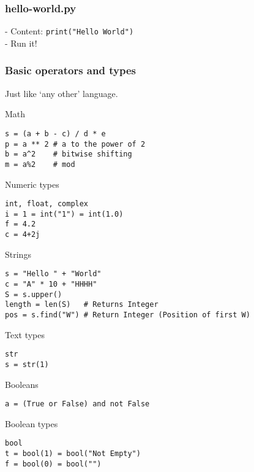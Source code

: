 \documentclass{beamer}
\begin{document}
\begin{frame}[fragile]
    \frametitle{hello-world.py}
    - Content: \texttt{print("Hello World")}\\
    - Run it!
\end{frame}
\begin{frame}[fragile]
    \frametitle{Basic operators and types}
    Just like `any other' language.
    \begin{block}{Math}
        \begin{verbatim}
s = (a + b - c) / d * e
p = a ** 2 # a to the power of 2
b = a^2    # bitwise shifting
m = a%2    # mod
        \end{verbatim}
    \end{block}
    \begin{exampleblock}{Numeric types}
    \begin{verbatim}
int, float, complex
i = 1 = int("1") = int(1.0)
f = 4.2
c = 4+2j
    \end{verbatim}
\end{exampleblock}
\end{frame}
\begin{frame}[fragile]
    \begin{block}{Strings}
        \begin{verbatim}
s = "Hello " + "World"
c = "A" * 10 + "HHHH"
S = s.upper()
length = len(S)   # Returns Integer
pos = s.find("W") # Return Integer (Position of first W)
        \end{verbatim}
    \end{block}
    \begin{exampleblock}{Text types}
        \begin{verbatim}
str
s = str(1)
        \end{verbatim}
    \end{exampleblock}
\end{frame}

\begin{frame}[fragile]
    \begin{block}{Booleans}
        \begin{verbatim}
a = (True or False) and not False
        \end{verbatim}
    \end{block}
    \begin{exampleblock}{Boolean types}
        \begin{verbatim}
bool
t = bool(1) = bool("Not Empty")
f = bool(0) = bool("")
        \end{verbatim}
    \end{exampleblock}
\end{frame}
\end{document}
